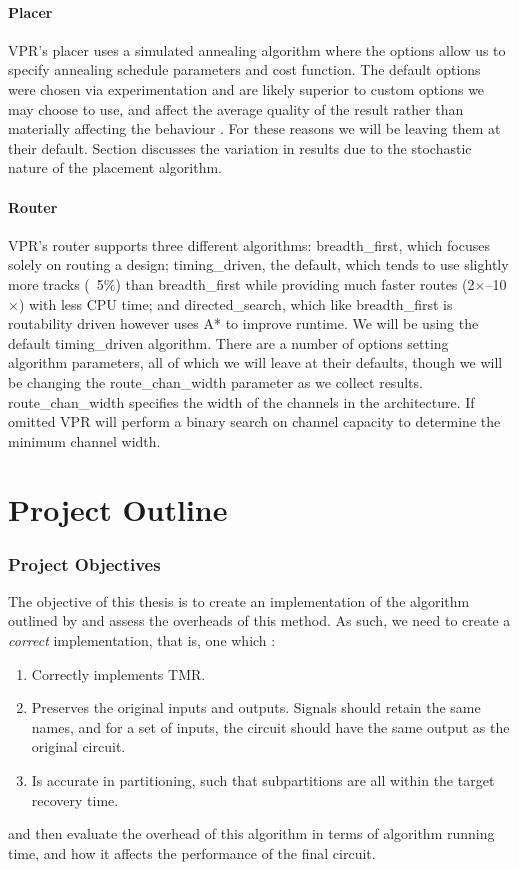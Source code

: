 \documentclass[12pt,final,oneside]{dwThesis} %
\begin{document}
   \subsubsection{Placer} \gls{VPR}'s placer uses a simulated annealing
   algorithm where the options allow us to specify annealing schedule
   parameters and cost function. The default options were chosen via
   experimentation and are likely superior to custom options we may choose to
   use, and affect the average quality of the result rather than materially
   affecting the behaviour \cite{VPRManual, VPRBook}. For these reasons we will
   be leaving them at their default.  Section  discusses the
   variation in results due to the stochastic nature of the placement
   algorithm.  \subsubsection{Router} \gls{VPR}'s router supports three
   different algorithms: breadth\_first, which
   focuses solely on routing a design; timing\_driven, the default, which tends
   to use slightly more tracks (~5\%) than breadth\_first while providing much
   faster routes (2$\times$--10$\times$) with less CPU time; and
   directed\_search, which like breadth\_first is routability driven however
   uses A* to improve runtime. We will be using the default timing\_driven
   algorithm. There are a number of options setting
   algorithm parameters, all of which we will leave at their defaults, though
   we will be changing the route\_chan\_width parameter as we collect results.
   route\_chan\_width specifies the width of the channels in the architecture.
   If omitted \gls{VPR} will perform a binary search on channel capacity to
   determine the minimum channel width.

\chapter{Project Outline} \subsection{Project Objectives}\label{secObjectives}
The objective of this thesis is to create an implementation of the algorithm
outlined by \cite{DiesselChange} and assess the overheads of this method.  As
such, we need to create a \textit{correct} implementation, that is, one which
:\begin{enumerate}
         \item Correctly implements TMR.
         \item Preserves the original inputs and outputs. Signals should retain
               the same names, and for a set of inputs, the circuit should have
               the same output as the original circuit.
         \item Is accurate in partitioning, such that subpartitions are all
               within the target recovery time.  \end{enumerate} and then
         evaluate the overhead of this algorithm in terms of algorithm running
         time, and how it affects the performance of the final circuit.
\end{document}
